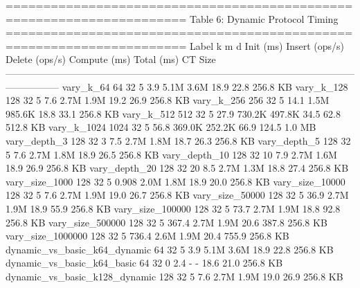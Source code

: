 ======================================================================
  Table 6: Dynamic Protocol Timing
======================================================================
                           Label     k   m   d  Init (ms)  Insert (ops/s)  Delete (ops/s)  Compute (ms)  Total (ms)   CT Size
-----------------------------------------------------------------------------------------------------------------------------
                       vary_k_64    64  32   5        3.9            5.1M            3.6M          18.9        22.8  256.8 KB
                      vary_k_128   128  32   5        7.6            2.7M            1.9M          19.2        26.9  256.8 KB
                      vary_k_256   256  32   5       14.1            1.5M          985.6K          18.8        33.1  256.8 KB
                      vary_k_512   512  32   5       27.9          730.2K          497.8K          34.5        62.8  512.8 KB
                     vary_k_1024  1024  32   5       56.8          369.0K          252.2K          66.9       124.5    1.0 MB
                    vary_depth_3   128  32   3        7.5            2.7M            1.8M          18.7        26.3  256.8 KB
                    vary_depth_5   128  32   5        7.6            2.7M            1.8M          18.9        26.5  256.8 KB
                   vary_depth_10   128  32  10        7.9            2.7M            1.6M          18.9        26.9  256.8 KB
                   vary_depth_20   128  32  20        8.5            2.7M            1.3M          18.8        27.4  256.8 KB
                  vary_size_1000   128  32   5      0.908            2.0M            1.8M          18.9        20.0  256.8 KB
                 vary_size_10000   128  32   5        7.6            2.7M            1.9M          19.0        26.7  256.8 KB
                 vary_size_50000   128  32   5       36.9            2.7M            1.9M          18.9        55.9  256.8 KB
                vary_size_100000   128  32   5       73.7            2.7M            1.9M          18.8        92.8  256.8 KB
                vary_size_500000   128  32   5      367.4            2.7M            1.9M          20.6       387.8  256.8 KB
               vary_size_1000000   128  32   5      736.4            2.6M            1.9M          20.4       755.9  256.8 KB
    dynamic_vs_basic_k64_dynamic    64  32   5        3.9            5.1M            3.6M          18.9        22.8  256.8 KB
      dynamic_vs_basic_k64_basic    64  32   0        2.4               -               -          18.6        21.0  256.8 KB
   dynamic_vs_basic_k128_dynamic   128  32   5        7.6            2.7M            1.9M          19.0        26.9  256.8 KB
